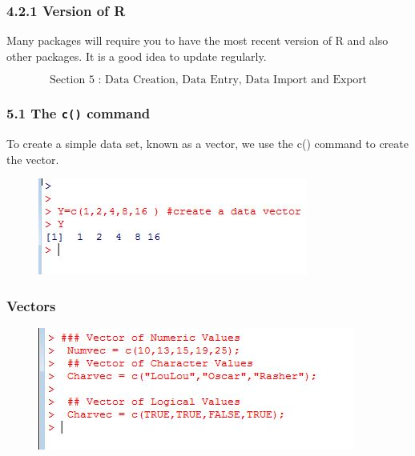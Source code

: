 \documentclass{beamer}
\begin{document}
 	\begin{frame}
 		\frametitle{4.2.1 Version of R}
 		Many packages will require you to have the most recent version of R and also other packages.
 		It is a good idea to update regularly.
 	\end{frame}
 	\begin{frame}
 		\[\mbox{Section 5 : Data Creation, Data Entry, Data Import and Export}\]
 	\end{frame}
 	\begin{frame}
 		\frametitle{5.1 The \texttt{c()} command}
 		To create a simple data set, known as a vector, we use the c() command to create the vector.
 		\begin{figure}
 			\centering
 			\includegraphics[width=1.2\linewidth]{images/makevector1}
 		\end{figure}
 		
 		
 	\end{frame}
 	\begin{frame}
 		\frametitle{Vectors}
 		\begin{figure}
 			\centering
 			\includegraphics[width=1.2\linewidth]{images/makevectors}
 		\end{figure}
 		
 	\end{frame}
\end{document}
